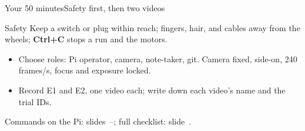 %
\begin{frame}{Your 50 minutes}{Safety first, then two videos}
  \small
  \begin{alertblock}{\small Safety}
    Keep a switch or plug within reach; fingers, hair, and cables away from the wheels; \textbf{Ctrl+C} stops a run and the motors.
  \end{alertblock}
  \vspace{6pt}
  \begin{itemize}\setlength{\itemsep}{6pt}
    \item Choose roles: Pi operator, camera, note-taker, git. Camera fixed, side-on, 240 frames/s, \alert{focus and exposure locked}.
    \item Record \alert{E1 and E2, one video each}; write down each video's name and the trial IDs.
  \end{itemize}

  \vfill
  {\footnotesize Commands on the Pi: slides~\pageref{app:pi-e1}--\pageref{app:pi-e2}; full checklist: slide~\pageref{app:fifty}.}
\end{frame}
